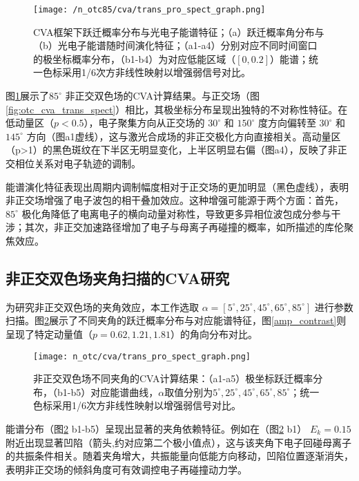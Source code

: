 \begin{figure}[!htbp]  %
	\centering
	\texttt{[image: /n\_otc85/cva/trans\_pro\_spect\_graph.png]}
	\caption{CVA框架下跃迁概率分布与光电子能谱特征；（a）跃迁概率角分布与（b）光电子能谱随时间演化特征；（a1-a4）分别对应不同时间窗口的极坐标概率分布，（b1-b4）为对应低能区域（$[0, 0.2]$）能谱；统一色标采用1/6次方非线性映射以增强弱信号对比。}
	\label{fig:n_otc85_cva_trans_spect}
\end{figure}

图\ref{fig:n_otc85_cva_trans_spect}展示了$85^\circ$ 非正交双色场的CVA计算结果。与正交场（图\ref{fig:otc_cva_trans_spect}）相比，其极坐标分布呈现出独特的不对称性特征。在低动量区（$p<0.5$），电子聚集方向从正交场的 $30^\circ$ 和 $150^\circ$ 度方向偏转至 $30^\circ$ 和 $145^\circ$ 方向（图a1虚线），这与激光合成场的非正交极化方向直接相关。高动量区（p>1）的黑色斑纹在下半区无明显变化，上半区明显右偏（图a4），反映了非正交相位关系对电子轨迹的调制。

能谱演化特征表现出周期内调制幅度相对于正交场的更加明显（黑色虚线），表明非正交场增强了电子波包的相干叠加效应。这种增强可能源于两个方面：首先，$85^\circ$ 极化角降低了电离电子的横向动量对称性，导致更多异相位波包成分参与干涉；其次，非正交加速路径增加了电子与母离子再碰撞的概率，如所描述的库伦聚焦效应。

\subsection{非正交双色场夹角扫描的CVA研究}

为研究非正交双色场的夹角效应，本工作选取 $\alpha = [5^\circ,25^\circ,45^\circ,65^\circ,85^\circ]$ 进行参数扫描。图\ref{fig:n_otc_cva_trans_spect}展示了不同夹角的跃迁概率分布与对应能谱特征，图\ref{amp_contrast}则呈现了特定动量值（$p=0.62,1.21,1.81$）的角向分布对比。

\begin{figure}[!htbp]
	\centering
	\texttt{[image: n\_otc/cva/trans\_pro\_spect\_graph.png]}
	\caption{非正交双色场不同夹角的CVA计算结果：（a1-a5）极坐标跃迁概率分布，（b1-b5）对应能谱曲线，$\alpha$取值分别为$5^\circ,25^\circ,45^\circ,65^\circ,85^\circ$；统一色标采用1/6次方非线性映射以增强弱信号对比。}
	\label{fig:n_otc_cva_trans_spect}
\end{figure}

能谱分布（图\ref{fig:n_otc_cva_trans_spect} b1-b5）呈现出显著的夹角依赖特征。例如在（图\ref{fig:n_otc_cva_trans_spect} b1） $E_k=0.15$ 附近出现显著凹陷（箭头,约对应第二个极小值点），这与该夹角下电子回碰母离子的共振条件相关。随着夹角增大，共振能量向低能方向移动，凹陷位置逐渐消失，表明非正交场的倾斜角度可有效调控电子再碰撞动力学。

